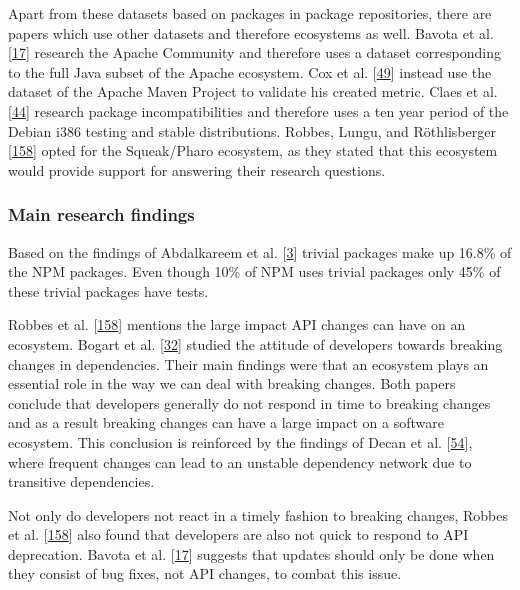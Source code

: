 \documentclass[]{book}
\begin{document}
Apart from these datasets based on packages in package repositories,
there are papers which use other datasets and therefore ecosystems as
well. Bavota et al. {[}\protect\hyperlink{ref-Bavota2014}{17}{]}
research the Apache Community and therefore uses a dataset corresponding
to the full Java subset of the Apache ecosystem. Cox et al.
{[}\protect\hyperlink{ref-Cox2015}{49}{]} instead use the dataset of the
Apache Maven Project to validate his created metric. Claes et al.
{[}\protect\hyperlink{ref-Claes2015}{44}{]} research package
incompatibilities and therefore uses a ten year period of the Debian
i386 testing and stable distributions. Robbes, Lungu, and Röthlisberger
{[}\protect\hyperlink{ref-Robbes2012}{158}{]} opted for the Squeak/Pharo
ecosystem, as they stated that this ecosystem would provide support for
answering their research questions.

\subsubsection{Main research findings}\label{main-research-findings}

Based on the findings of Abdalkareem et al.
{[}\protect\hyperlink{ref-Abdalkareem2017}{3}{]} trivial packages make
up 16.8\% of the NPM packages. Even though 10\% of NPM uses trivial
packages only 45\% of these trivial packages have tests.

Robbes et al. {[}\protect\hyperlink{ref-Robbes2012}{158}{]} mentions the
large impact API changes can have on an ecosystem. Bogart et al.
{[}\protect\hyperlink{ref-Bogart2016}{32}{]} studied the attitude of
developers towards breaking changes in dependencies. Their main findings
were that an ecosystem plays an essential role in the way we can deal
with breaking changes. Both papers conclude that developers generally do
not respond in time to breaking changes and as a result breaking changes
can have a large impact on a software ecosystem. This conclusion is
reinforced by the findings of Decan et al.
{[}\protect\hyperlink{ref-Decan2018}{54}{]}, where frequent changes can
lead to an unstable dependency network due to transitive dependencies.

Not only do developers not react in a timely fashion to breaking
changes, Robbes et al. {[}\protect\hyperlink{ref-Robbes2012}{158}{]}
also found that developers are also not quick to respond to API
deprecation. Bavota et al. {[}\protect\hyperlink{ref-Bavota2014}{17}{]}
suggests that updates should only be done when they consist of bug
fixes, not API changes, to combat this issue.
\end{document}
